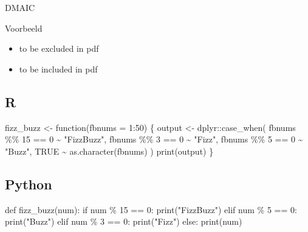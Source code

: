 \documentclass[
  letterpaper,
  DIV=11,
  numbers=noendperiod]{scrartcl}
\newenvironment{Shaded}{\begin{snugshade}}{\end{snugshade}}
\newcommand{\AttributeTok}[1]{\textcolor[rgb]{0.40,0.45,0.13}{#1}}
\newcommand{\BuiltInTok}[1]{\textcolor[rgb]{0.00,0.23,0.31}{#1}}
\newcommand{\ConstantTok}[1]{\textcolor[rgb]{0.56,0.35,0.01}{#1}}
\newcommand{\ControlFlowTok}[1]{\textcolor[rgb]{0.00,0.23,0.31}{#1}}
\newcommand{\DecValTok}[1]{\textcolor[rgb]{0.68,0.00,0.00}{#1}}
\newcommand{\FunctionTok}[1]{\textcolor[rgb]{0.28,0.35,0.67}{#1}}
\newcommand{\KeywordTok}[1]{\textcolor[rgb]{0.00,0.23,0.31}{#1}}
\newcommand{\NormalTok}[1]{\textcolor[rgb]{0.00,0.23,0.31}{#1}}
\newcommand{\OperatorTok}[1]{\textcolor[rgb]{0.37,0.37,0.37}{#1}}
\newcommand{\OtherTok}[1]{\textcolor[rgb]{0.00,0.23,0.31}{#1}}
\newcommand{\SpecialCharTok}[1]{\textcolor[rgb]{0.37,0.37,0.37}{#1}}
\newcommand{\StringTok}[1]{\textcolor[rgb]{0.13,0.47,0.30}{#1}}
\providecommand{\tightlist}{%
  \setlength{\itemsep}{0pt}\setlength{\parskip}{0pt}}\usepackage{longtable,booktabs,array}
\begin{document}
DMAIC

Voorbeeld

\begin{itemize}
\tightlist
\item
  to be excluded in pdf
\item
  to be included in pdf
\end{itemize}

\subsection{R}

\begin{Shaded}
\begin{Highlighting}[]
\NormalTok{fizz\_buzz }\OtherTok{\textless{}{-}} \ControlFlowTok{function}\NormalTok{(}\AttributeTok{fbnums =} \DecValTok{1}\SpecialCharTok{:}\DecValTok{50}\NormalTok{) \{}
\NormalTok{  output }\OtherTok{\textless{}{-}}\NormalTok{ dplyr}\SpecialCharTok{::}\FunctionTok{case\_when}\NormalTok{(}
\NormalTok{    fbnums }\SpecialCharTok{\%\%} \DecValTok{15} \SpecialCharTok{==} \DecValTok{0} \SpecialCharTok{\textasciitilde{}} \StringTok{"FizzBuzz"}\NormalTok{,}
\NormalTok{    fbnums }\SpecialCharTok{\%\%} \DecValTok{3} \SpecialCharTok{==} \DecValTok{0} \SpecialCharTok{\textasciitilde{}} \StringTok{"Fizz"}\NormalTok{,}
\NormalTok{    fbnums }\SpecialCharTok{\%\%} \DecValTok{5} \SpecialCharTok{==} \DecValTok{0} \SpecialCharTok{\textasciitilde{}} \StringTok{"Buzz"}\NormalTok{,}
    \ConstantTok{TRUE} \SpecialCharTok{\textasciitilde{}} \FunctionTok{as.character}\NormalTok{(fbnums)}
\NormalTok{  )}
  \FunctionTok{print}\NormalTok{(output)}
\NormalTok{\}}
\end{Highlighting}
\end{Shaded}

\subsection{Python}

\begin{Shaded}
\begin{Highlighting}[]
\KeywordTok{def}\NormalTok{ fizz\_buzz(num):}
  \ControlFlowTok{if}\NormalTok{ num }\OperatorTok{\%} \DecValTok{15} \OperatorTok{==} \DecValTok{0}\NormalTok{:}
    \BuiltInTok{print}\NormalTok{(}\StringTok{"FizzBuzz"}\NormalTok{)}
  \ControlFlowTok{elif}\NormalTok{ num }\OperatorTok{\%} \DecValTok{5} \OperatorTok{==} \DecValTok{0}\NormalTok{:}
    \BuiltInTok{print}\NormalTok{(}\StringTok{"Buzz"}\NormalTok{)}
  \ControlFlowTok{elif}\NormalTok{ num }\OperatorTok{\%} \DecValTok{3} \OperatorTok{==} \DecValTok{0}\NormalTok{:}
    \BuiltInTok{print}\NormalTok{(}\StringTok{"Fizz"}\NormalTok{)}
  \ControlFlowTok{else}\NormalTok{:}
    \BuiltInTok{print}\NormalTok{(num)}
\end{Highlighting}
\end{Shaded}
\end{document}
